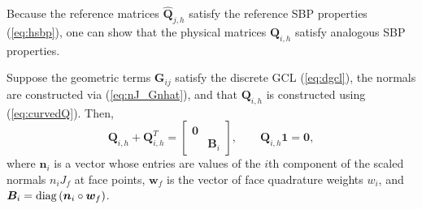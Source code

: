 \documentclass{svjour3}                     %
\renewcommand{\hat}{\widehat}
\newcommand{\diag}[1]{{\rm diag}\LRp{#1}}
\newcommand{\LRp}[1]{\left( #1 \right)}
\begin{document}
Because the reference matrices $\hat{\bm{Q}}_{j,h}$ satisfy the reference SBP properties (\ref{eq:hsbp}), one can show \cite{chan2018discretely} that the physical matrices $\bm{Q}_{i,h}$ satisfy analogous SBP properties.  
\begin{lemma}
\label{lemma:Qhprops}
Suppose the geometric terms $\bm{G}_{ij}$ satisfy the discrete GCL (\ref{eq:dgcl}), the normals are constructed via (\ref{eq:nJ_Gnhat}), and that $\bm{Q}_{i,h}$ is constructed using (\ref{eq:curvedQ}).  Then, 
\[
\bm{Q}_{i,h} + \bm{Q}_{i,h}^T = \begin{bmatrix}
\bm{0} &\\
& \bm{B}_i \end{bmatrix}, \qquad \bm{Q}_{i,h}\bm{1} = \bm{0},
\]
where $\bm{n}_i$ is a vector whose entries are values of the $i$th component of the scaled normals $n_iJ_f$ at face points, $\bm{w}_f$ is the vector of face quadrature weights $w_i$, and $\bm{B}_i = \diag{\bm{n}_i \circ \bm{w}_f}$.
\end{lemma}
\end{document}
